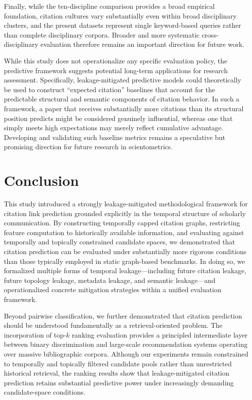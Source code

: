 \documentclass[11pt,a4paper]{article}
\begin{document}
Finally, while the ten-discipline comparison provides a broad empirical foundation, citation cultures vary substantially even within broad disciplinary clusters, and the present datasets represent single keyword-based queries rather than complete disciplinary corpora. Broader and more systematic cross-disciplinary evaluation therefore remains an important direction for future work.

While this study does not operationalize any specific evaluation policy, the predictive framework suggests potential long-term applications for research assessment. Specifically, leakage-mitigated predictive models could theoretically be used to construct ``expected citation'' baselines that account for the predictable structural and semantic components of citation behavior. In such a framework, a paper that receives substantially more citations than its structural position predicts might be considered genuinely influential, whereas one that simply meets high expectations may merely reflect cumulative advantage. Developing and validating such baseline metrics remains a speculative but promising direction for future research in scientometrics.

\section{Conclusion}
\label{sec:conclusion}

This study introduced a strongly leakage-mitigated methodological framework for citation link prediction grounded explicitly in the temporal structure of scholarly communication. By constructing temporally capped citation graphs, restricting feature computation to historically available information, and evaluating against temporally and topically constrained candidate spaces, we demonstrated that citation prediction can be evaluated under substantially more rigorous conditions than those typically employed in static graph-based benchmarks. In doing so, we formalized multiple forms of temporal leakage---including future citation leakage, future topology leakage, metadata leakage, and semantic leakage---and operationalized concrete mitigation strategies within a unified evaluation framework.

Beyond pairwise classification, we further demonstrated that citation prediction should be understood fundamentally as a retrieval-oriented problem. The incorporation of top-\(k\) ranking evaluation provides a principled intermediate layer between binary discrimination and large-scale recommendation systems operating over massive bibliographic corpora. Although our experiments remain constrained to temporally and topically filtered candidate pools rather than unrestricted historical retrieval, the ranking results show that leakage-mitigated citation prediction retains substantial predictive power under increasingly demanding candidate-space conditions.
\end{document}
